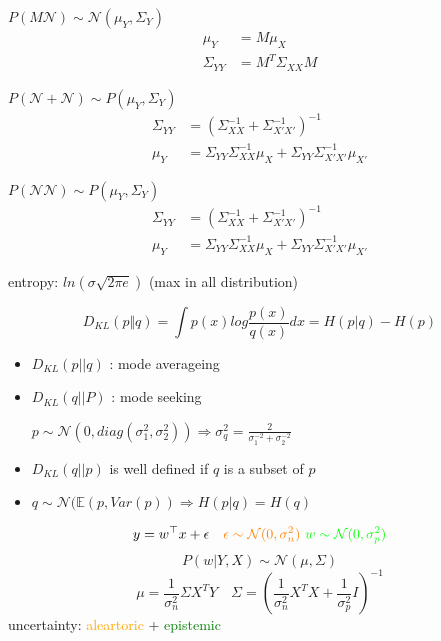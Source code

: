 \documentclass[landscape,a0paper,fontscale=0.285]{baposter} %
\newcommand{\compresslist}{ %
\setlength{\itemsep}{1pt}
\setlength{\parskip}{0pt}
\setlength{\parsep}{0pt}
}
\begin{document}
\begin{poster}
{$P(M \mathcal N)\sim \mathcal N(\mu_Y, \Sigma_Y)$
\vspace{-0.3cm}
$$
\begin{aligned}
\mu_Y &= M\mu_X\\
\Sigma_{YY} &= M^T\Sigma_{XX}M
\end{aligned}
$$

$P(\mathcal N + \mathcal N) \sim P(\mu_{Y}, \Sigma_Y)$
\vspace{-0.3cm}
$$
\begin{aligned}
\Sigma_{YY}&= (\Sigma_{XX}^{-1}+\Sigma_{X'X'}^{-1})^{-1}
\\
\mu_{Y} &= \Sigma_{YY}\Sigma_{XX}^{-1}\mu_X + \Sigma_{YY}\Sigma_{X'X'}^{-1}\mu_{X'}
\end{aligned}
$$

$P(\mathcal N \mathcal N) \sim P(\mu_{Y}, \Sigma_Y)$
\vspace{-0.3cm}
$$
\begin{aligned}
\Sigma_{YY}&= (\Sigma_{XX}^{-1}+\Sigma_{X'X'}^{-1})^{-1}
\\
\mu_{Y} &= \Sigma_{YY}\Sigma_{XX}^{-1}\mu_X + \Sigma_{YY}\Sigma_{X'X'}^{-1}\mu_{X'}
\end{aligned}
$$

entropy: $ln(\sigma\sqrt{2\pi e})$ (max in all distribution)

\colorbox[HTML]{CCFFFF}{} 
\vspace{-0.3cm}
$$
D_{KL}(p\Vert q) = \int  p(x)log\frac{p(x)}{q(x)}dx = H(p\vert q) - H(p)
$$
\begin{itemize}\compresslist
    \item $D_{KL}(p||q)$ : mode averageing
    \item $D_{KL}(q||P)$ : mode seeking
    
    $p\sim\mathcal N(0,diag(\sigma_1^2,\sigma_2^2))\Rightarrow\sigma_q^2 = \frac{2}{\sigma_1^{-2}+\sigma_2^{-2}}$
    \item $D_{KL}(q||p)$ is well defined if $q$ is a subset of $p$
    \item $q\sim \mathcal N(\mathbb E(p,Var(p)) \Rightarrow H(p\vert q)=H(q)$
\end{itemize}


\colorbox[HTML]{CCFFFF}{}
\vspace{-0.3cm}
$$
y = w^\top x + \epsilon\quad 
\textcolor{orange}{\epsilon\sim \mathcal N(0,\sigma_n^2)}
~
\textcolor{green}{w\sim\mathcal N(0,\sigma_p^2)}
$$
$$
P(w|Y,X) \sim \mathcal N(\mu,\Sigma)
$$
$$
\mu = \frac{1}{\sigma_n^2}\Sigma X^TY \quad
\Sigma = \left(\frac{1}{\sigma_n^2}X^TX + \frac{1}{\sigma_p^2}I\right)^{-1}
$$
uncertainty: \textcolor{orange}{aleartoric} + \textcolor{green}{epistemic}

}
\end{poster}
\end{document}
